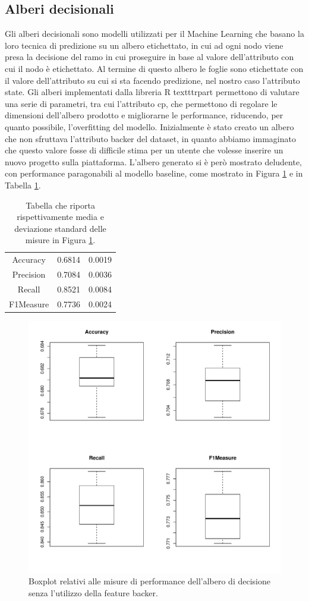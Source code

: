 \subsection{Alberi decisionali}
Gli alberi decisionali sono modelli utilizzati per il Machine Learning che basano la loro tecnica di predizione su un albero etichettato, in cui ad ogni nodo viene presa la decisione del ramo in cui proseguire in base al valore dell'attributo con cui il nodo è etichettato. Al termine di questo albero le foglie sono etichettate con il valore dell'attributo su cui si sta facendo predizione, nel nostro caso l'attributo state. Gli alberi implementati dalla libreria R texttt{rpart} permettono di valutare una serie di parametri, tra cui l'attributo cp, che permettono di regolare le dimensioni dell'albero prodotto e migliorarne le performance, riducendo, per quanto possibile, l'overfitting del modello.
Inizialmente è stato creato un albero che non sfruttava l'attributo backer del dataset, in quanto abbiamo immaginato che questo valore fosse di difficile stima per un utente che volesse inserire un nuovo progetto sulla piattaforma. L'albero generato si è però mostrato deludente, con performance paragonabili al modello baseline, come mostrato in Figura \ref{fig:treenbperformance} e in Tabella \ref{tab:treenbperformance}.
\begin{table}
	\caption{Tabella che riporta rispettivamente media e deviazione standard delle misure in Figura \ref{fig:treenbperformance}.}
	\label{tab:treenbperformance}
	\centering
	\begin{tabular}{c|c|c}
		Accuracy & 0.6814 & 0.0019 \\ 
		Precision & 0.7084 & 0.0036 \\
		Recall & 0.8521 & 0.0084 \\
		F1Measure & 0.7736 & 0.0024 \\
	\end{tabular}
\end{table}
\begin{figure}
	\centering
	\includegraphics[width=0.7\linewidth]{../FinalResults/TreeNB_performance}
	\caption{Boxplot relativi alle misure di performance dell'albero di decisione senza l'utilizzo della feature backer.}
	\label{fig:treenbperformance}
\end{figure}
